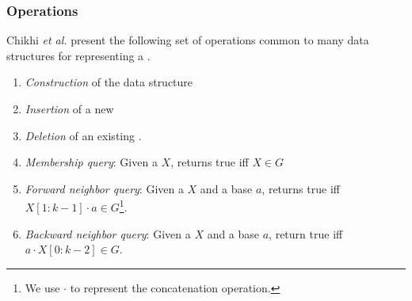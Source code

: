 
\subsubsection{Operations}
\label{subsubsec:dbg-operations}

Chikhi \emph{et al.} \cite{Chikhi2019} present the following set of operations common to many data structures for representing a \dBG {}.

\begin{enumerate}
  \item \emph{Construction} of the data structure
  \item \emph{Insertion} of a new \kmer
  \item \emph{Deletion} of an existing \kmer.
  \item \emph{Membership query}: Given a \kmer $X$, returns true iff $X \in G$
  \item \emph{Forward neighbor query}: Given a \kmer $X$ and a base $a$, returns true iff $X[1:k-1] \cdot a \in G$\footnote{We use $\cdot$ to represent the concatenation operation.}.
  \item \emph{Backward neighbor query}: Given a \kmer $X$ and a base $a$, return true iff $a \cdot X[0:k-2] \in G$.
\end{enumerate}

